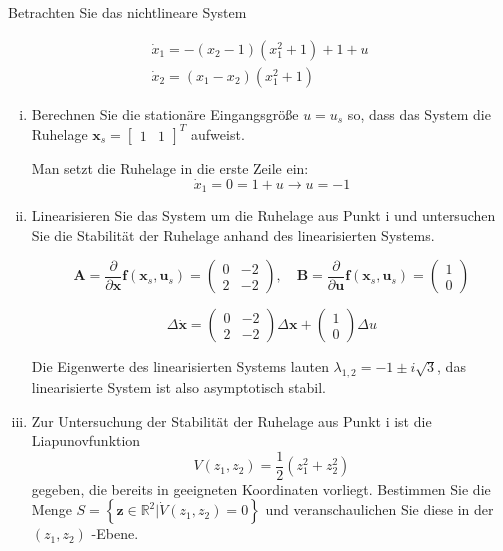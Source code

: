 \documentclass[crop=false]{standalone}
\begin{document}
\begin{task}
Betrachten Sie das nichtlineare System

\[ 
\begin{array}{l}{\dot{x}_{1}=-\left(x_{2}-1\right)\left(x_{1}^{2}+1\right)+1+u} \\ {\dot{x}_{2}=\left(x_{1}-x_{2}\right)\left(x_{1}^{2}+1\right)}\end{array}
 \]
 
\begin{enumerate}[i.]
    \item Berechnen Sie die stationäre Eingangsgröße $u=u_{s}$ so, dass das System die Ruhelage $\mathbf{x}_{s}=\left[\begin{array}{ll}{1} &{1}\end{array}\right]^{T}$ aufweist.
    \begin{solution}
    Man setzt die Ruhelage in die erste Zeile ein:
    \[ \dot{x}_1 = 0  = 1 + u \rightarrow u = -1 \]
    \end{solution}
    \item Linearisieren Sie das System um die Ruhelage aus Punkt i und
untersuchen Sie die Stabilität der Ruhelage anhand des linearisierten Systems.
\begin{solution}

\[ 
\mathbf{A}=\frac{\partial}{\partial \mathbf{x}} \mathbf{f}\left(\mathbf{x}_{s}, \mathbf{u}_{s}\right) = \begin{pmatrix}0 & -2 \\ 2 & -2\end{pmatrix}
, \quad
\mathbf{B}=\frac{\partial}{\partial \mathbf{u}} \mathbf{f}\left(\mathbf{x}_{s}, \mathbf{u}_{s}\right) = \begin{pmatrix}1 \\ 0 \end{pmatrix}\]

\[\Delta \dot{\mathbf{x}} = \begin{pmatrix}0 & -2 \\ 2 & -2\end{pmatrix} \Delta \mathbf{x} + \begin{pmatrix}1 \\ 0 \end{pmatrix} \Delta u\]

Die Eigenwerte des linearisierten Systems lauten $\lambda_{1,2} = -1 \pm i\sqrt{3}$, das linearisierte System ist also asymptotisch stabil.
 
    \end{solution}
    \item Zur Untersuchung der Stabilität der Ruhelage aus Punkt i ist die
Liapunovfunktion
\[ 
V\left(z_{1}, z_{2}\right)=\frac{1}{2}\left(z_{1}^{2}+z_{2}^{2}\right)
 \]
gegeben, die bereits in geeigneten Koordinaten vorliegt. Bestimmen Sie die Menge
$S=\left\{\mathbf{z} \in \mathbb{R}^{2} | \dot{V}\left(z_{1}, z_{2}\right)=0\right\}$ und veranschaulichen Sie diese in der $\left(z_{1}, z_{2}\right)$ -Ebene.


\end{enumerate}
\end{task}
\end{document}
